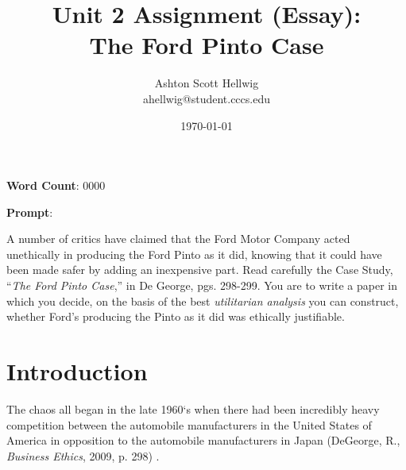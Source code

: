 \documentclass[12pt]{article}
\title{Unit 2 Assignment (Essay):\\%
    \Large{%
      The Ford Pinto Case%
    }
  }
\author{%
    Ashton Scott Hellwig\\%
    \normalsize{ahellwig@student.cccs.edu}
  }
\date{\today}
\newcommand{\tbcite}[1]{%
    (DeGeorge, R., \textit{Business Ethics}, 2009, p. #1)%
  }
\begin{document}
  \maketitle
  \thispagestyle{plain}
  \vspace{-25pt}
  \begin{mdframed}[%
    style=wordcount,%
    nobreak=true,%
    align=center,%
    userdefinedwidth=10em%
  ]
    \begin{center}
      \textbf{Word Count}: 0000
    \end{center}
  \end{mdframed}

  \tableofcontents
  \vspace{20pt}
  \begin{mdframed}
    \large{\textbf{Prompt}}:

    A number of critics have claimed that the Ford Motor Company acted
      unethically in producing the Ford Pinto as it did, knowing that it could
      have been made safer by adding an inexpensive part. Read carefully the
      Case Study, ``\textit{The Ford Pinto Case},'' in De George, pgs. 298-299.
      You are to write a paper in which you decide, on the basis of the best
      \textit{utilitarian analysis} you can construct, whether Ford's producing
      the Pinto as it did was ethically justifiable.
  \end{mdframed}


  \newpage
  \section{Introduction}
    The chaos all began in the late 1960`s when there had been incredibly heavy
      competition between the automobile manufacturers in the United States of
      America in opposition to the automobile manufacturers in Japan
      \tbcite{298}.


  \newpage
  \nocite{*}
  \printbibliography[%
    heading=bibintoc,%
    title={Works Cited},%
    notcategory=consulted%
  ]
  \printbibliography[%
    heading=bibintoc,%
    title={Works Consulted},%
    category=consulted%
  ]
\end{document}
